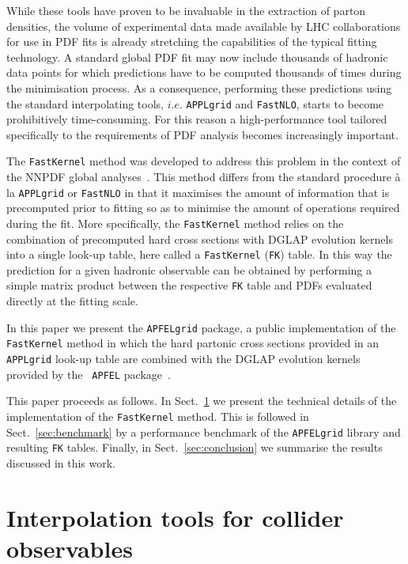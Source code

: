 \documentclass[preprint,12pt]{elsarticle}
\begin{document}
While these tools have proven to be invaluable in the extraction
of parton densities, the volume of experimental data made available by
LHC collaborations for use in PDF fits is already stretching the
capabilities of the typical fitting technology. A standard
global PDF fit may now include thousands of hadronic data points for which
predictions have to be computed thousands of times during the
minimisation process. As a consequence, performing these predictions
using the standard interpolating tools, $i.e.$
{\tt APPLgrid} and {\tt FastNLO}, starts to become prohibitively time-consuming.
For this reason a high-performance tool tailored specifically to the requirements of PDF analysis becomes increasingly
important.

The {\tt FastKernel} method was developed to
address this problem in the context of the NNPDF global analyses~\cite{Ball:2014uwa}. This method differs from the standard procedure
\`{a} la {\tt APPLgrid} or {\tt FastNLO} in that it maximises the
amount of information that is precomputed prior to fitting so as to
minimise the amount of operations required during the
fit. More specifically, the {\tt FastKernel} method relies on the
combination of precomputed hard cross sections with DGLAP evolution
kernels into a single look-up table, here called
a {\tt FastKernel} ({\tt FK}) table. In this way the prediction
for a given hadronic observable can be obtained by performing a simple matrix
product between the respective {\tt FK} table and PDFs evaluated directly at the fitting scale.

In this paper we present the {\tt APFELgrid} package, a public
implementation of the {\tt FastKernel} method in which the hard
partonic cross sections provided in an {\tt APPLgrid} look-up table
are combined with the DGLAP evolution kernels provided by the {\tt
  APFEL}
package~\cite{Bertone:2013vaa}.

This paper proceeds as follows. In
Sect.~\ref{sec:FastKernel} we present the technical details of the
implementation of the {\tt FastKernel} method. This is followed in
Sect.~\ref{sec:benchmark} by a performance benchmark of the
{\tt APFELgrid} library and resulting {\tt FK} tables. Finally, in
Sect.~\ref{sec:conclusion} we summarise the results discussed in this
work.

\section{Interpolation tools for collider observables}\label{sec:FastKernel}
\end{document}
